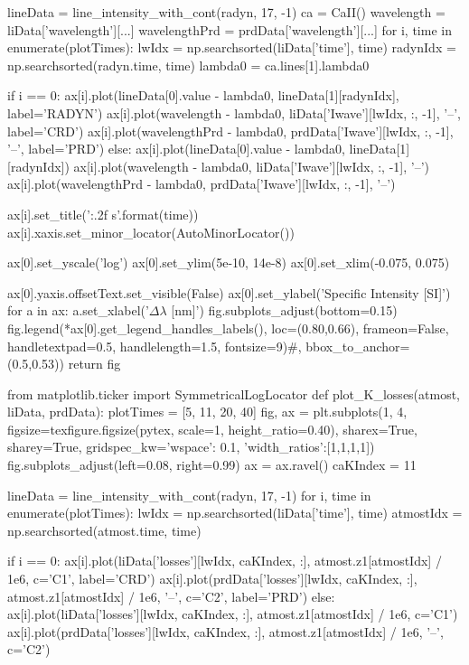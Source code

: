 \begin{pycode}[TimeDepRT]
    lineData = line_intensity_with_cont(radyn, 17, -1)
    ca = CaII()
    wavelength = liData['wavelength'][...]
    wavelengthPrd = prdData['wavelength'][...]
    for i, time in enumerate(plotTimes):
        lwIdx = np.searchsorted(liData['time'], time)
        radynIdx = np.searchsorted(radyn.time, time)
        lambda0 = ca.lines[1].lambda0

        if i == 0:
            ax[i].plot(lineData[0].value - lambda0, lineData[1][radynIdx], label='RADYN')
            ax[i].plot(wavelength - lambda0, liData['Iwave'][lwIdx, :, -1], '--', label='CRD')
            ax[i].plot(wavelengthPrd - lambda0, prdData['Iwave'][lwIdx, :, -1], '--', label='PRD')
        else:
            ax[i].plot(lineData[0].value - lambda0, lineData[1][radynIdx])
            ax[i].plot(wavelength - lambda0, liData['Iwave'][lwIdx, :, -1], '--')
            ax[i].plot(wavelengthPrd - lambda0, prdData['Iwave'][lwIdx, :, -1], '--')

        ax[i].set_title('{:.2f} s'.format(time))
        ax[i].xaxis.set_minor_locator(AutoMinorLocator())

    ax[0].set_yscale('log')
    ax[0].set_ylim(5e-10, 14e-8)
    ax[0].set_xlim(-0.075, 0.075)

    ax[0].yaxis.offsetText.set_visible(False)
    ax[0].set_ylabel('Specific Intensity [SI]')
    for a in ax:
        a.set_xlabel('$\Delta\lambda$ [nm]')
    fig.subplots_adjust(bottom=0.15)
    fig.legend(*ax[0].get_legend_handles_labels(), loc=(0.80,0.66), frameon=False,
               handletextpad=0.5, handlelength=1.5, fontsize=9)#, bbox_to_anchor=(0.5,0.53))
    return fig

from matplotlib.ticker import SymmetricalLogLocator
def plot_K_losses(atmost, liData, prdData):
    plotTimes = [5, 11, 20, 40]
    fig, ax = plt.subplots(1, 4, figsize=texfigure.figsize(pytex, scale=1, height_ratio=0.40),
                           sharex=True, sharey=True,
                           gridspec_kw={'wspace': 0.1, 'width_ratios':[1,1,1,1]})
    fig.subplots_adjust(left=0.08, right=0.99)
    ax = ax.ravel()
    caKIndex = 11

    lineData = line_intensity_with_cont(radyn, 17, -1)
    for i, time in enumerate(plotTimes):
        lwIdx = np.searchsorted(liData['time'], time)
        atmostIdx = np.searchsorted(atmost.time, time)

        if i == 0:
            ax[i].plot(liData['losses'][lwIdx, caKIndex, :],
                       atmost.z1[atmostIdx] / 1e6, c='C1', label='CRD')
            ax[i].plot(prdData['losses'][lwIdx, caKIndex, :],
                       atmost.z1[atmostIdx] / 1e6, '--', c='C2', label='PRD')
        else:
            ax[i].plot(liData['losses'][lwIdx, caKIndex, :],
                       atmost.z1[atmostIdx] / 1e6, c='C1')
            ax[i].plot(prdData['losses'][lwIdx, caKIndex, :],
                       atmost.z1[atmostIdx] / 1e6, '--', c='C2')


\end{pycode}
